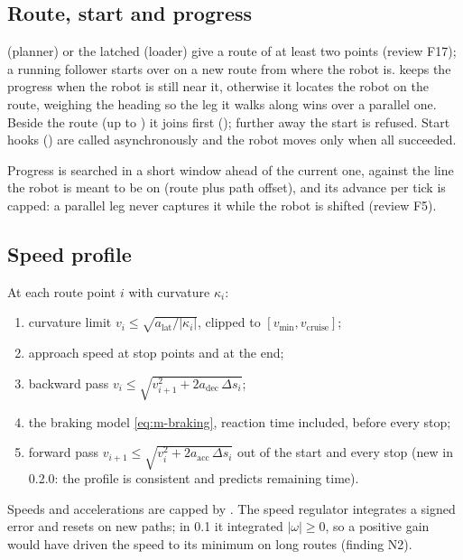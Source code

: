 \subsection{Route, start and progress}

 (planner) or the latched  (loader) give a
route of at least two points (review F17); a running follower starts over on a new route from
where the robot is.  keeps the progress when the robot is still near it,
otherwise it locates the robot on the route, weighing the heading so the leg it walks along wins
over a parallel one. Beside the route (up to ) it joins first
(); further away the start is refused. Start hooks () are called
asynchronously and the robot moves only when all succeeded.

Progress is searched in a short window ahead of the current one, against the line the robot is
meant to be on (route plus path offset), and its advance per tick is capped: a parallel leg never
captures it while the robot is shifted (review F5).

\subsection{Speed profile}

At each route point $i$ with curvature $\kappa_i$:
\begin{enumerate}
  \item curvature limit $v_i \le \sqrt{a_{\mathrm{lat}}/|\kappa_i|}$, clipped to
    $[v_{\min}, v_{\mathrm{cruise}}]$;
  \item approach speed at stop points and at the end;
  \item backward pass $v_i \le \sqrt{v_{i+1}^2 + 2 a_{\mathrm{dec}}\,\Delta s_i}$;
  \item the braking model \eqref{eq:m-braking}, reaction time included, before every stop;
  \item forward pass $v_{i+1} \le \sqrt{v_i^2 + 2 a_{\mathrm{acc}}\,\Delta s_i}$ out of the start
    and every stop (new in 0.2.0: the profile is consistent and predicts remaining time).
\end{enumerate}
Speeds and accelerations are capped by . The speed regulator integrates a
signed error and resets on new paths; in 0.1 it integrated $|\omega| \ge 0$, so a positive gain
would have driven the speed to its minimum on long routes (finding N2).

